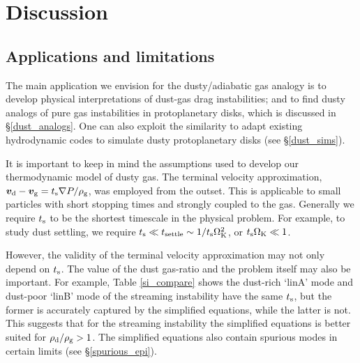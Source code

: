 \section{Discussion}\label{discussion}


{\bf


\subsection{Applications and limitations}

The main application we envision for the dusty/adiabatic gas analogy 
is to develop physical interpretations of dust-gas drag instabilities; and to find 
dusty analogs of pure gas instabilities in protoplanetary disks, 
which is discussed in \S\ref{dust_analogs}. One can also exploit the similarity to adapt existing
hydrodynamic codes to simulate dusty protoplanetary disks (see \S\ref{dust_sims}). 

It is important to keep in mind the assumptions 
used to develop our thermodynamic model of dusty gas. 
The terminal velocity approximation, $\bm{v}_\mathrm{d} -
\bm{v}_\mathrm{g} = t_\mathrm{s} \nabla P /\rho_\mathrm{g}$, was employed from the
outset. 
This is applicable to small particles with short stopping times and
strongly coupled to the gas. Generally we require $t_\mathrm{s}$ to be the
shortest timescale in the physical problem. For  
example, to study dust settling, we require $t_\mathrm{s} \ll
t_\mathrm{settle}\sim 1/t_\mathrm{s}\Omega_{\rm K}^2$, or 
$t_\mathrm{s}\Omega_{\rm K} \ll 1$. 


However, the validity of the terminal velocity approximation may not
only depend on $t_\mathrm{s}$. The value of the dust gas-ratio and the
problem itself may also be important. 
For example, Table \ref{si_compare} shows the dust-rich
`linA' mode and dust-poor `linB' mode of the streaming instability
have the same $t_\mathrm{s}$, but the former is accurately captured by the
simplified equations, while the latter is not.  This suggests that for
the streaming instability the simplified equations is better suited
for $\rho_\mathrm{d}/\rho_\mathrm{g}>1$. The simplified equations also contain spurious
modes in certain limits (see \S\ref{spurious_epi}). 

}
